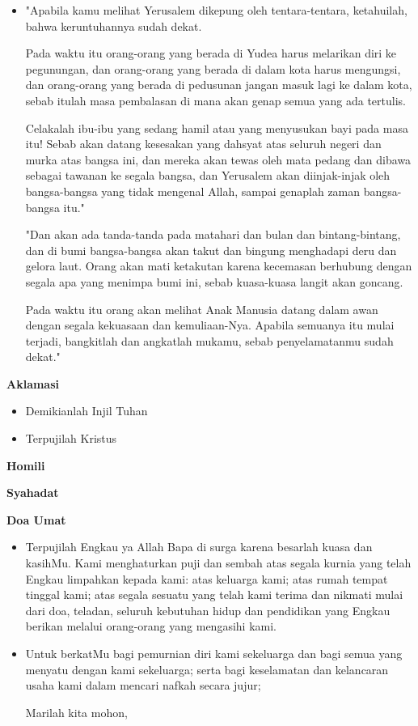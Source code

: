 \documentclass[a5paper,titlepage,10pt,openany]{scrbook}
\makeatletter
\newcommand{\subjudul}[1]{%
  {\parindent \z@ 
    \interlinepenalty\@M \bfseries #1\par\nobreak \vskip 10\p@ }}
\newcommand{\BU}[1]{\begin{itemize} \item[U:] #1 \end{itemize}}
\newcommand{\BI}[1]{\begin{itemize} \item[I:] #1 \end{itemize}}
\newcommand{\BP}[1]{\begin{itemize} \item[P:] #1 \end{itemize}}
\makeatother
\begin{document}
\BI{"Apabila kamu melihat Yerusalem dikepung oleh tentara-tentara, ketahuilah, bahwa keruntuhannya sudah dekat.

Pada waktu itu orang-orang yang berada di Yudea harus melarikan diri ke pegunungan, dan orang-orang yang berada di dalam kota harus mengungsi, dan orang-orang yang berada di pedusunan jangan masuk lagi ke dalam kota, sebab itulah masa pembalasan di mana akan genap semua yang ada tertulis.

Celakalah ibu-ibu yang sedang hamil atau yang menyusukan bayi pada masa itu! Sebab akan datang kesesakan yang dahsyat atas seluruh negeri dan murka atas bangsa ini,
dan mereka akan tewas oleh mata pedang dan dibawa sebagai tawanan ke segala bangsa, dan Yerusalem akan diinjak-injak oleh bangsa-bangsa yang tidak mengenal Allah, sampai genaplah zaman bangsa-bangsa itu."

"Dan akan ada tanda-tanda pada matahari dan bulan dan bintang-bintang, dan di bumi bangsa-bangsa akan takut dan bingung menghadapi deru dan gelora laut.
Orang akan mati ketakutan karena kecemasan berhubung dengan segala apa yang menimpa bumi ini, sebab kuasa-kuasa langit akan goncang.

Pada waktu itu orang akan melihat Anak Manusia datang dalam awan dengan segala kekuasaan dan kemuliaan-Nya.
Apabila semuanya itu mulai terjadi, bangkitlah dan angkatlah mukamu, sebab penyelamatanmu sudah dekat."}

\subjudul{Aklamasi}

\BI{Demikianlah Injil Tuhan}

\BU{Terpujilah Kristus}

 

\subjudul{Homili}

\subjudul{Syahadat} 

\subjudul{Doa Umat}

\BI{Terpujilah Engkau ya Allah Bapa di surga karena besarlah kuasa 
dan kasihMu. Kami menghaturkan puji dan sembah atas segala 
kurnia yang telah Engkau limpahkan kepada kami: atas keluarga 
kami; atas rumah tempat tinggal kami; atas segala sesuatu yang 
telah kami terima dan nikmati mulai dari doa, teladan, seluruh 
kebutuhan hidup dan pendidikan yang Engkau berikan melalui 
orang-orang yang mengasihi kami.}

\BP{Untuk berkatMu bagi pemurnian diri kami sekeluarga dan 
bagi semua yang menyatu dengan kami sekeluarga; serta 
bagi keselamatan dan kelancaran usaha kami dalam mencari 
nafkah secara jujur; 

Marilah kita mohon,}
\end{document}
